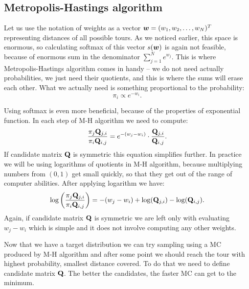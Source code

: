 \subsection{Metropolis-Hastings algorithm}
	Let us use the notation of weights as a vector $\bm{w} = (w_1, w_2, \ldots, w_N)^T$ representing distances of all possible tours. As we noticed earlier, this space is enormous, so calculating softmax of this vector $s(\bm{w})$ is again not feasible, because of enormous sum in the denominator $\sum_{j=1}^{N} e^{w_j}$. This is where Metropolis-Hastings algorithm comes in handy -- we do not need actually probabilities, we just need their quotients, and this is where the sums will erase each other. What we actually need is something proportional to the probability:
	\begin{equation*}
		\pi_i \propto e^{-w_i}.
	\end{equation*}
	
	
	
	Using softmax is even more beneficial, because of the properties of exponential function. In each step of M-H algorithm we need to compute:
	\begin{equation*}
		\frac{\pi_j \mathbf{Q}_{j,i}}{\pi_i \mathbf{Q}_{i,j}} = e^{-(w_j-w_i)} \cdot \frac{\mathbf{Q}_{j,i}}{\mathbf{Q}_{i,j}}.
	\end{equation*}
	If candidate matrix $\mathbf{Q}$ is symmetric this equation simplifies further. In practice we will be using logarithms of quotients in M-H algorithm, because multiplying numbers from $(0,1)$ get small quickly, so that they get out of the range of computer abilities. After applying logarithm we have:
	\begin{equation*}
		\log \left( \frac{\pi_j \mathbf{Q}_{j,i}}{\pi_i \mathbf{Q}_{i,j}} \right) = -(w_j-w_i) + \log(\mathbf{Q}_{j,i}) - \log(\mathbf{Q}_{i,j}).
	\end{equation*}
	Again, if candidate matrix $\mathbf{Q}$ is symmetric we are left only with evaluating $w_j-w_i$ which is simple and it does not involve computing any other weights.
	
	Now that we have a target distribution we can try sampling using a MC produced by M-H algorithm and after some point we should reach the tour with highest probability, \ie smallest distance covered. To do that we need to define candidate matrix $\mathbf{Q}$. The better the candidates, the faster MC can get to the minimum.

